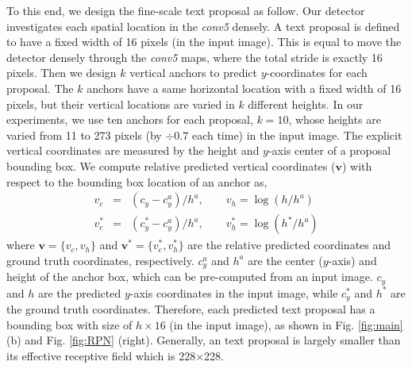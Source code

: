 \documentclass[runningheads]{llncs}
\begin{document}
To this end, we design the fine-scale text proposal as follow. Our detector investigates each spatial location in the \textit{conv5} densely. A text proposal is defined to have a fixed width of 16 pixels (in the input image). This is equal to move the detector densely through the \textit{conv5} maps, where the total stride is exactly 16 pixels. Then we design $k$ vertical anchors to  predict  $y$-coordinates for each proposal. The $k$ anchors have a same horizontal location with a fixed width of 16 pixels, but their  vertical locations are varied in $k$ different heights. In our experiments, we use ten anchors for each proposal, $k=10$, whose heights are varied from 11 to 273 pixels (by $\div 0.7$ each time) in the input image. The explicit vertical coordinates are measured by the height   and $y$-axis center of a proposal bounding box. We compute relative predicted vertical coordinates ($\textbf{v}$) with respect to the bounding box location of an anchor as, 
 \begin{eqnarray}
v_c&=&(c_y-c_y^a)/h^a, \qquad v_h=\log (h/h^a) \\\label{eq:coordinate}
v^*_c&=&(c^*_y-c_y^a)/h^a, \qquad v^*_h=\log (h^*/h^a)\label{eq:coordinate_gt}
\end{eqnarray}
where $\textbf{v}=\{v_c,v_h\}$ and  $\textbf{v}^*=\{v^*_c,v^*_h\}$ are the relative predicted coordinates and ground truth coordinates, respectively. $c_y^a$ and $h^a$ are the center ($y$-axis) and height of the anchor box, which can be pre-computed from an input image. $c_y$ and $h$ are the predicted $y$-axis coordinates in the input image, while $c^*_y$ and $h^*$ are the ground truth coordinates. Therefore, each predicted text proposal has a bounding box with size of $h\times 16$ (in the input image), as shown in Fig. \ref{fig:main} (b) and Fig. \ref{fig:RPN} (right).  Generally, an text proposal is largely smaller than its effective receptive field which is 228$\times$228.
\end{document}
